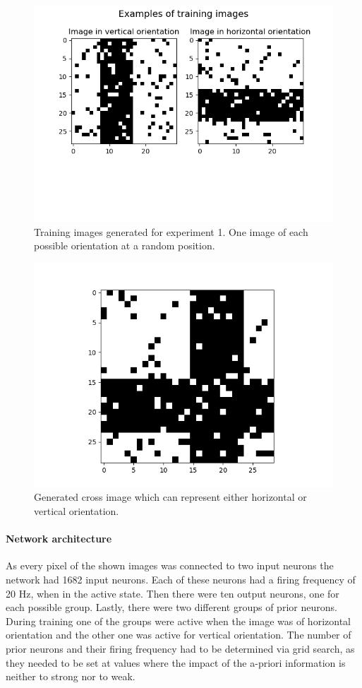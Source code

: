 \begin{figure}
  \includegraphics[width=\linewidth]{figures/horvert/horvertTrainingImages.png}
  \caption{Training images generated for experiment 1. One image of each possible orientation at a random position.}
  \label{fig:horvertImages}
\end{figure}

\begin{figure}
  \includegraphics[width=0.6\linewidth]{figures/horvert/horvertTrainingCrossImage.png}
  \caption{Generated cross image which can represent either horizontal or vertical orientation.}
  \label{fig:horvertTrainingCrossImage}
\end{figure}

\paragraph{Network architecture}

As every pixel of the shown images was connected to two input neurons the network had 1682 input neurons. Each of these neurons had a firing frequency of 20 Hz, when in the active state. Then there were ten output neurons, one for each possible group. Lastly, there were two different groups of prior neurons. During training one of the groups were active when the image was of horizontal orientation and the other one was active for vertical orientation. The number of prior neurons and their firing frequency had to be determined via grid search, as they needed to be set at values where the impact of the a-priori information is neither to strong nor to weak.

